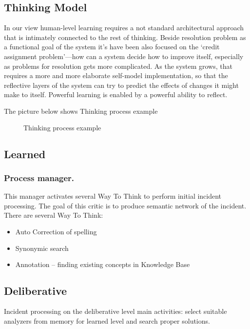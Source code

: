 \documentclass[runningheads,a4paper]{llncs}
\begin{document}
\begin{enumerate}
\section{Thinking Model}
In our view human-level learning requires a not standard architectural approach that is intimately connected to the rest of thinking. Beside resolution problem as a functional goal of the system it’s have been also focused on the ‘credit assignment problem’—how can a system decide how to improve itself, especially as problems  for resolution gets more complicated.  As the system grows, that  requires a more and more elaborate self-model implementation, so that the reflective layers of the system can try to predict the effects of changes it might make to itself. Powerful learning is enabled by a powerful ability to reflect.

The picture below shows Thinking process example

\begin{figure}


\caption{Thinking process example}
\end{figure}

\subsection{Learned}

\subsubsection{Process manager.} This manager activates several Way To Think to perform initial incident processing. The goal of this critic is to produce semantic network of the incident. There are several Way To Think:
\begin{itemize}
 \item Auto Correction of spelling
 \item Synonymic search
 \item Annotation – finding existing concepts in Knowledge Base
\end{itemize}

\subsection{Deliberative}

Incident processing on the deliberative level main activities: select suitable analyzers from memory for learned level and search proper solutions.


\end{enumerate}
\end{document}
